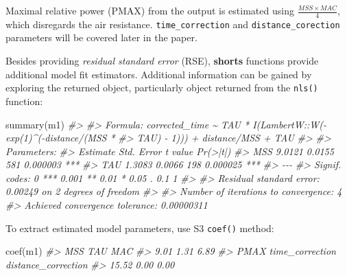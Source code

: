 \documentclass[fleqn,10pt,lineno]{wlpeerj} %
\newenvironment{Shaded}{\begin{snugshade}}{\end{snugshade}}
\newcommand{\CommentTok}[1]{\textcolor[rgb]{0.56,0.35,0.01}{\textit{#1}}}
\newcommand{\FunctionTok}[1]{\textcolor[rgb]{0.00,0.00,0.00}{#1}}
\newcommand{\NormalTok}[1]{#1}
\begin{document}
Maximal relative power (PMAX) from the output is estimated using \(\frac{MSS \times MAC}{4}\), which disregards the air resistance. \texttt{time\_correction} and \texttt{distance\_corection} parameters will be covered later in the paper.

Besides providing \emph{residual standard error} (RSE), \textbf{shorts} functions provide additional model fit estimators. Additional information can be gained by exploring the returned object, particularly object returned from the \texttt{nls()} function:

\begin{Shaded}
\begin{Highlighting}[]
\FunctionTok{summary}\NormalTok{(m1)}
\CommentTok{\#\textgreater{} }
\CommentTok{\#\textgreater{} Formula: corrected\_time \textasciitilde{} TAU * I(LambertW::W({-}exp(1)\^{}({-}distance/(MSS * }
\CommentTok{\#\textgreater{}     TAU) {-} 1))) + distance/MSS + TAU}
\CommentTok{\#\textgreater{} }
\CommentTok{\#\textgreater{} Parameters:}
\CommentTok{\#\textgreater{}     Estimate Std. Error t value Pr(\textgreater{}|t|)    }
\CommentTok{\#\textgreater{} MSS   9.0121     0.0155     581 0.000003 ***}
\CommentTok{\#\textgreater{} TAU   1.3083     0.0066     198 0.000025 ***}
\CommentTok{\#\textgreater{} {-}{-}{-}}
\CommentTok{\#\textgreater{} Signif. codes:  0 \textquotesingle{}***\textquotesingle{} 0.001 \textquotesingle{}**\textquotesingle{} 0.01 \textquotesingle{}*\textquotesingle{} 0.05 \textquotesingle{}.\textquotesingle{} 0.1 \textquotesingle{} \textquotesingle{} 1}
\CommentTok{\#\textgreater{} }
\CommentTok{\#\textgreater{} Residual standard error: 0.00249 on 2 degrees of freedom}
\CommentTok{\#\textgreater{} }
\CommentTok{\#\textgreater{} Number of iterations to convergence: 4 }
\CommentTok{\#\textgreater{} Achieved convergence tolerance: 0.00000311}
\end{Highlighting}
\end{Shaded}

To extract estimated model parameters, use S3 \texttt{coef()} method:

\begin{Shaded}
\begin{Highlighting}[]
\FunctionTok{coef}\NormalTok{(m1)}
\CommentTok{\#\textgreater{}                 MSS                 TAU                 MAC }
\CommentTok{\#\textgreater{}                9.01                1.31                6.89 }
\CommentTok{\#\textgreater{}                PMAX     time\_correction distance\_correction }
\CommentTok{\#\textgreater{}               15.52                0.00                0.00}
\end{Highlighting}
\end{Shaded}
\end{document}
